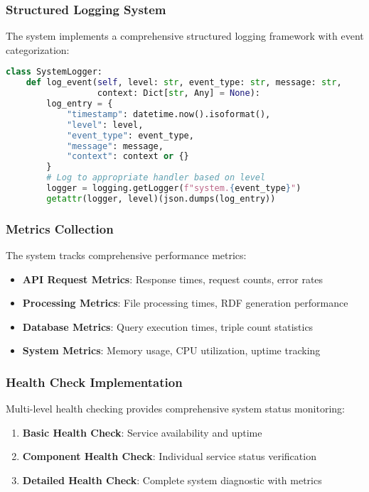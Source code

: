 \documentclass[12pt,a4paper]{article}
\begin{document}
\subsubsection{Structured Logging System}

The system implements a comprehensive structured logging framework with event categorization:

\begin{lstlisting}[language=python,caption=Structured Logging Implementation]
class SystemLogger:
    def log_event(self, level: str, event_type: str, message: str, 
                  context: Dict[str, Any] = None):
        log_entry = {
            "timestamp": datetime.now().isoformat(),
            "level": level,
            "event_type": event_type,
            "message": message,
            "context": context or {}
        }
        # Log to appropriate handler based on level
        logger = logging.getLogger(f"system.{event_type}")
        getattr(logger, level)(json.dumps(log_entry))
\end{lstlisting}

\subsubsection{Metrics Collection}

The system tracks comprehensive performance metrics:

\begin{itemize}
    \item \textbf{API Request Metrics}: Response times, request counts, error rates
    \item \textbf{Processing Metrics}: File processing times, RDF generation performance
    \item \textbf{Database Metrics}: Query execution times, triple count statistics
    \item \textbf{System Metrics}: Memory usage, CPU utilization, uptime tracking
\end{itemize}

\subsubsection{Health Check Implementation}

Multi-level health checking provides comprehensive system status monitoring:

\begin{enumerate}
    \item \textbf{Basic Health Check}: Service availability and uptime
    \item \textbf{Component Health Check}: Individual service status verification
    \item \textbf{Detailed Health Check}: Complete system diagnostic with metrics
\end{enumerate}
\end{document}
